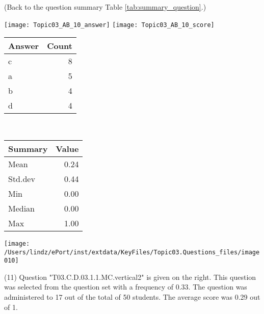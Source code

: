 \documentclass[12pt,english,nohyper]{tufte-handout}\usepackage[]{graphicx}\usepackage[]{color}
\begin{document}
 (Back to the question summary Table \ref{tab:summary_question}.)

\begin{center} \texttt{[image: Topic03\_AB\_10\_answer]} \texttt{[image: Topic03\_AB\_10\_score]} \end{center} 

\begin{center}%
\begin{tabular}{lr}
  \hline
Answer & Count \\ 
  \hline
c &   8 \\ 
  a &   5 \\ 
  b &   4 \\ 
  d &   4 \\ 
   \hline
\end{tabular}
~~~~~~~~%
\begin{tabular}{lr}
  \hline
Summary & Value \\ 
  \hline
Mean & 0.24 \\ 
  Std.dev & 0.44 \\ 
  Min & 0.00 \\ 
  Median & 0.00 \\ 
  Max & 1.00 \\ 
   \hline
\end{tabular}
\end{center}\newpage{}



\vspace{4cm}\begin{marginfigure}\texttt{[image: /Users/lindz/ePort/inst/extdata/KeyFiles/Topic03.Questions\_files/image010]}\end{marginfigure}\vspace{-4cm} (11) Question "T03.C.D.03.1.1.MC.vertical2" is given on the right. This question was selected from the question set with a frequency of 0.33. The question was administered to 17 out of the total of 50 students. The average score was 0.29 out of 1.
\end{document}
